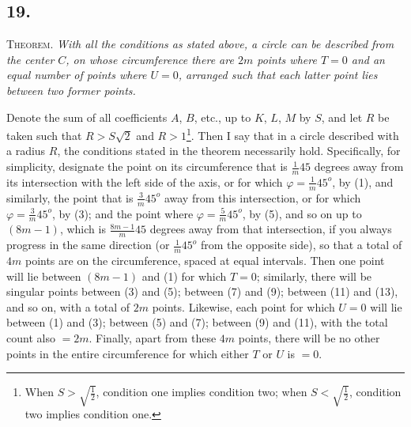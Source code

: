 \documentclass[12pt]{memoir}
\theoremstyle{plain}
\theoremstyle{remark}
\begin{document}
\subsection*{19.}

\textsc{Theorem}. \textit{With all the conditions as stated above, a circle can be described from the center \(C\), on whose circumference there are \(2m\) points where \(T=0\) and an equal number of points where \(U=0\), arranged such that each latter point lies between two former points.}

Denote the sum of all coefficients \(A\), \(B\), etc., up to \(K\), \(L\), \(M\) by \(S\), and let \(R\) be taken such that \(R > S\surd{2}\) and \(R > 1\)\footnote{When \(S > \surd{\frac{1}{2}}\), condition one implies condition two; when \(S < \surd{\frac{1}{2}}\), condition two implies condition one.}. Then I say that in a circle described with a radius \(R\), the conditions stated in the theorem necessarily hold. Specifically, for simplicity, designate the point on its circumference that is \( \frac{1}{m}45\) degrees away from its intersection with the left side of the axis, or for which \(\varphi = \frac{1}{m} 45^o\), by (1), and similarly, the point that is \( \frac{3}{m}45^o\) away from this intersection, or for which \(\varphi = \frac{3}{m} 45^o\), by (3); and the point where \(\varphi = \frac{5}{m} 45^o\), by (5), and so on up to \((8m-1)\), which is \( \frac{8m-1}{m} 45\) degrees away from that intersection, if you always progress in the same direction (or \( \frac{1}{m}45^o\) from the opposite side), so that a total of \(4m\) points are on the circumference, spaced at equal intervals.  Then one point will lie between \((8m-1)\) and (1) for which \(T=0\); similarly, there will be singular points between (3) and (5); between (7) and (9); between (11) and (13), and so on, with a total of \(2m\) points. Likewise, each point for which \(U=0\) will lie between (1) and (3); between (5) and (7); between (9) and (11), with the total count also \(=2m\). Finally, apart from these \(4m\) points, there will be no other points in the entire circumference for which either \(T\) or \(U\) is \(= 0\).
\end{document}
